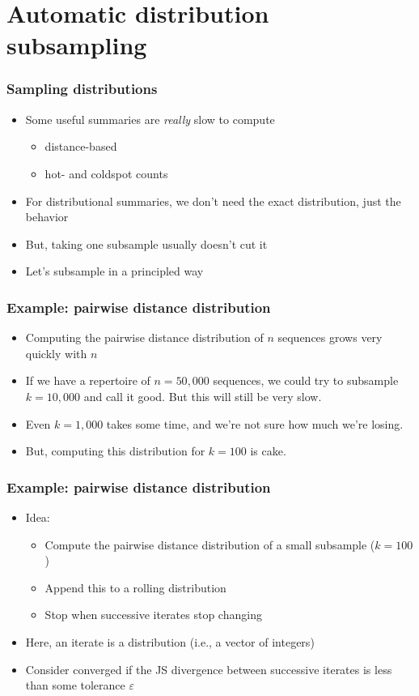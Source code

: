 \documentclass[mathserif,compress]{beamer}
\newcommand*\eps{\epsilon}
\renewcommand\;{\,}
\renewcommand\epsilon{\varepsilon}
\begin{document}
\section{Automatic distribution subsampling}

\begin{frame}\frametitle{Sampling distributions}
\begin{itemize}
\item Some useful summaries are \emph{really} slow to compute
\begin{itemize}
\item distance-based
\medskip
\item hot- and coldspot counts
\end{itemize}
\bigskip
\item For distributional summaries, we don't need the exact distribution, just the behavior
\bigskip
\item
But, taking one subsample usually doesn't cut it
\bigskip
\item Let's subsample in a principled way
\end{itemize}
\end{frame}

\begin{frame}\frametitle{Example: pairwise distance distribution}
\begin{itemize}
\item
Computing the pairwise distance distribution of $n$ sequences grows very quickly with $n$
\bigskip
\item
If we have a repertoire of $n = 50,000$ sequences, we could try to subsample $k = 10,000$ and call it good. But this will still be very slow. 
\item
Even $k = 1,000$ takes some time, and we're not sure how much we're losing.

\bigskip
\item But, computing this distribution for $k = 100$ is cake. 
\end{itemize}
\end{frame}

\begin{frame}\frametitle{Example: pairwise distance distribution}
\begin{itemize}
\item Idea:
\begin{itemize}
\item
Compute the pairwise distance distribution of a small subsample ($k = 100$)
\item
Append this to a rolling distribution
\item
Stop when successive iterates stop changing
\end{itemize}
\item
Here, an iterate is a distribution (i.e., a vector of integers)
\bigskip
\item
Consider converged if the JS divergence between successive iterates is less than some tolerance $\eps$
\end{itemize}
\end{frame}
\end{document}

